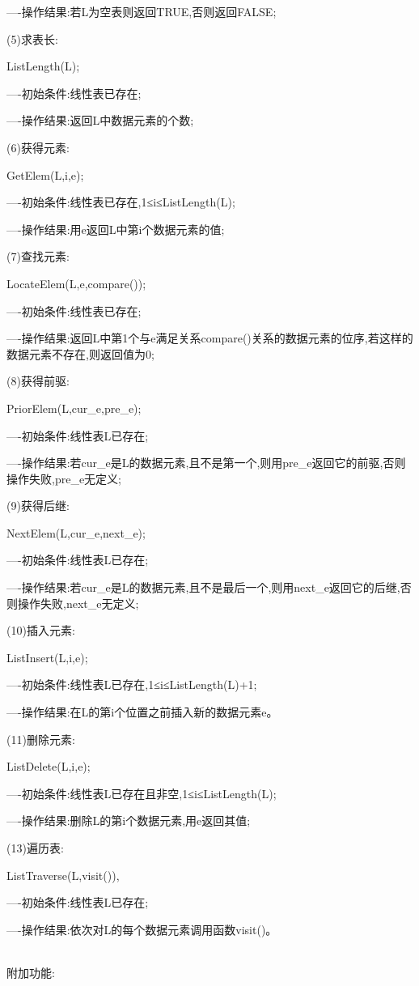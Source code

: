 \documentclass[supercite]{Experimental_Report}
\theoremstyle{definition}
\begin{document}
----操作结果:若L为空表则返回TRUE,否则返回FALSE;

(5)求表长:

ListLength(L);

----初始条件:线性表已存在;

----操作结果:返回L中数据元素的个数;

(6)获得元素:

GetElem(L,i,e);

----初始条件:线性表已存在,1≤i≤ListLength(L);

----操作结果:用e返回L中第i个数据元素的值;

(7)查找元素:

LocateElem(L,e,compare());

----初始条件:线性表已存在;

----操作结果:返回L中第1个与e满足关系compare()关系的数据元素的位序,若这样的数据元素不存在,则返回值为0;

(8)获得前驱:

PriorElem(L,cur\_e,pre\_e);

----初始条件:线性表L已存在;

----操作结果:若cur\_e是L的数据元素,且不是第一个,则用pre\_e返回它的前驱,否则操作失败,pre\_e无定义;

(9)获得后继:

NextElem(L,cur\_e,next\_e);

----初始条件:线性表L已存在;

----操作结果:若cur\_e是L的数据元素,且不是最后一个,则用next\_e返回它的后继,否则操作失败,next\_e无定义;

(10)插入元素:

ListInsert(L,i,e);

----初始条件:线性表L已存在,1≤i≤ListLength(L)+1;

----操作结果:在L的第i个位置之前插入新的数据元素e。

(11)删除元素:

ListDelete(L,i,e);

----初始条件:线性表L已存在且非空,1≤i≤ListLength(L);

----操作结果:删除L的第i个数据元素,用e返回其值;

(13)遍历表:

ListTraverse(L,visit()),

----初始条件:线性表L已存在;

----操作结果:依次对L的每个数据元素调用函数visit()。

\\

附加功能:
\end{document}
